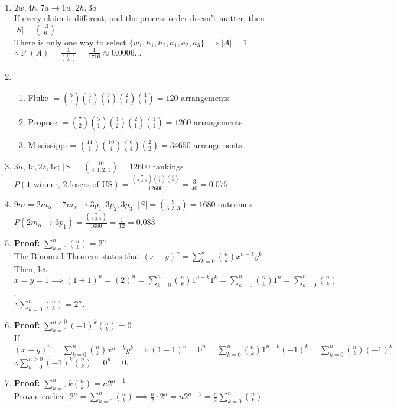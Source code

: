 \documentclass{article}
\newcommand{\proof}[1]{\textbf{Proof: #1}}
\newcommand{\set}[1]{\{#1\}}
\newcommand{\pr}[1]{\operatorname{P}(#1)}
\begin{document}
\begin{enumerate}
  \item $2w, 4h, 7a \to 1w, 2h, 3a$\\
  If every claim is different, and the process order doesn't matter, then $|S| = \binom{13}{6}$\\
  There is only one way to select $\set{w_1, h_1, h_2, a_1, a_2, a_3} \implies |A| = 1$\\
  $\therefore \pr{A} = \frac{1}{\binom{13}{6}} = \frac{1}{1716} \approx 0.0006\ldots$
  
  \newpage
  \item \begin{enumerate}
    \item Fluke $=\binom{5}{1}\binom{4}{1}\binom{3}{1}\binom{2}{1}\binom{1}{1} = 120$ arrangements
    \item Propose $= \binom{7}{2}\binom{5}{1}\binom{4}{2}\binom{2}{1}\binom{1}{1} = 1260$ arrangements
    \item Mississippi = $\binom{11}{1}\binom{10}{4}\binom{6}{4}\binom{2}{2} = 34650$ arrangements
  \end{enumerate}
  
  \item $3u, 4r, 2z, 1c$; $|S| = \binom{10}{3,4,2,1} = 12600$ rankings\\
  $P(\text{1 winner, 2 losers of US}) = \frac{\binom{7}{2,4,1}\binom{3}{1}\binom{3}{2}}{12600} = \frac{3}{40} = 0.075$
  
  \item $9m = 2m_\alpha + 7m_x \to 3p_1, 3p_2, 3p_3$; $|S| = \binom{9}{3,3,3} = 1680$ outcomes\\
  $P(2m_\alpha \to 3p_1) = \frac{\binom{7}{1,3,3}}{1680} = \frac{1}{12} = 0.08\overline{3}$
  
  \item \proof{}$\sum_{k=0}^{n}\binom{n}{k} = 2^n$\\
  The Binomial Theorem states that $(x+y)^n = \sum_{k=0}^{n}\binom{n}{k}x^{n-k}y^k$.\\
  Then, let $x=y=1 \implies (1+1)^n = (2)^n = \sum_{k=0}^{n}\binom{n}{k}1^{n-k}1^k = \sum_{k=0}^{n}\binom{n}{k}1^n = \sum_{k=0}^{n}\binom{n}{k}$.\\
  $\therefore \sum_{k=0}^{n}\binom{n}{k} = 2^n$.
  
  \item \proof{} $\sum_{k=0}^{n>0}(-1)^k\binom{n}{k} = 0$\\
  If $(x+y)^n = \sum_{k=0}^{n}\binom{n}{k}x^{n-k}y^k \implies (1 - 1)^n = 0^n = \sum_{k=0}^{n}\binom{n}{k}1^{n-k}(-1)^k = \sum_{k=0}^{n}\binom{n}{k}(-1)^k$\\
  $\therefore \sum_{k=0}^{n>0}(-1)^k\binom{n}{k} = 0^n = 0$.
  
  \item \proof{}$\sum_{k=0}^{n}k\binom{n}{k}=n2^{n-1}$\\
  Proven earlier, $2^n = \sum_{k=0}^{n}\binom{n}{k} \implies \frac{n}{2}\cdot2^{n} = n2^{n-1} = \frac{n}{2}\sum_{k=0}^{n}\binom{n}{k}$
\end{enumerate}
\end{document}
